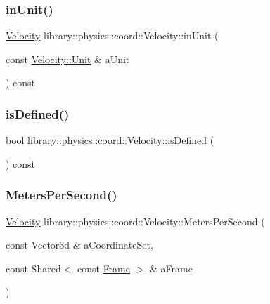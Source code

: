 \mbox{\label{classlibrary_1_1physics_1_1coord_1_1_velocity_a814e6740d6b54cf5421d9aa7fc0f5958}} 
\subsubsection{\texorpdfstring{in\+Unit()}{inUnit()}}
{\footnotesize\ttfamily \hyperlink{classlibrary_1_1physics_1_1coord_1_1_velocity}{Velocity} library\+::physics\+::coord\+::\+Velocity\+::in\+Unit (\begin{DoxyParamCaption}\item[{const \hyperlink{classlibrary_1_1physics_1_1coord_1_1_velocity_a8bbc811932c454dbe0ab8b56f1b2c0b3}{Velocity\+::\+Unit} \&}]{a\+Unit }\end{DoxyParamCaption}) const}

\mbox{\label{classlibrary_1_1physics_1_1coord_1_1_velocity_a5487f6d50e13d2262bf0726ed8536c99}} 
\subsubsection{\texorpdfstring{is\+Defined()}{isDefined()}}
{\footnotesize\ttfamily bool library\+::physics\+::coord\+::\+Velocity\+::is\+Defined (\begin{DoxyParamCaption}{ }\end{DoxyParamCaption}) const}

\mbox{\label{classlibrary_1_1physics_1_1coord_1_1_velocity_ae00ee3d929b00160789cf33dcb448ae3}} 
\subsubsection{\texorpdfstring{Meters\+Per\+Second()}{MetersPerSecond()}}
{\footnotesize\ttfamily \hyperlink{classlibrary_1_1physics_1_1coord_1_1_velocity}{Velocity} library\+::physics\+::coord\+::\+Velocity\+::\+Meters\+Per\+Second (\begin{DoxyParamCaption}\item[{const Vector3d \&}]{a\+Coordinate\+Set,  }\item[{const Shared$<$ const \hyperlink{classlibrary_1_1physics_1_1coord_1_1_frame}{Frame} $>$ \&}]{a\+Frame }\end{DoxyParamCaption})\hspace{0.3cm}{\ttfamily [static]}}

